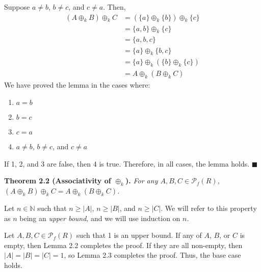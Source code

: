 \documentclass{article}
\newcommand{\abs}[1]{\left|#1\right|}
\newcommand{\N}{\mathbb{N}}
\begin{document}
Suppose $a \neq b$, $b \neq c$, and $c \neq a$. Then,
\[\begin{split}
    (A \oplus_k B) \oplus_k C
    &= (\{a\} \oplus_k \{b\}) \oplus_k \{c\} \\
    &= \{a, b\} \oplus_k \{c\} \\
    &= \{a, b, c\} \\
    &= \{a\} \oplus_k \{b, c\} \\
    &= \{a\} \oplus_k (\{b\} \oplus_k \{c\}) \\
    &= A \oplus_k (B \oplus_k C)
\end{split}\]
We have proved the lemma in the cases where:
\begin{enumerate}
    \item $a = b$
    \item $b = c$
    \item $c = a$
    \item $a \neq b$, $b \neq c$, and $c \neq a$
\end{enumerate}
If 1, 2, and 3 are false, then 4 is true. Therefore,
in all cases, the lemma holds.
$\blacksquare$

\textbf{Theorem 2.2 (Associativity of $\oplus_k$).} \textit{
    For any $A, B, C \in \mathcal{P}_f(R)$,
    $(A \oplus_k B) \oplus_k C = A \oplus_k (B \oplus_k C)$.
}

Let $n \in \N$ such that $n \geq \abs{A}$, $n \geq \abs{B}$, and
$n \geq \abs{C}$. We will refer to this property as $n$ being
an \textit{upper bound}, and we will use induction on $n$.

Let $A, B, C \in \mathcal{P}_f(R)$
such that 1 is an upper bound.
If any of $A$, $B$,
or $C$ is empty, then Lemma 2.2 completes the proof.
If they are all non-empty, then
$\abs{A} = \abs{B} = \abs{C} = 1$, so Lemma 2.3
completes the proof. Thus, the base case holds.
\end{document}
